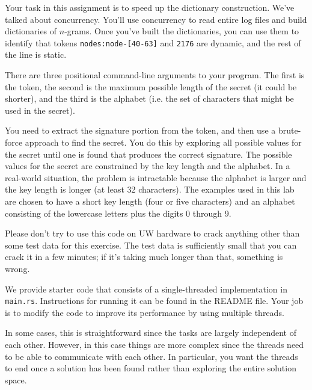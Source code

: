 \documentclass[12pt]{article}
\renewcommand{\_}{\kern-1.5pt\textunderscore\kern-1.5pt}
\begin{document}
Your task in this assignment is to speed up the dictionary construction. We've talked about concurrency. You'll use concurrency to read entire log files and build dictionaries of $n$-grams. Once you've built the dictionaries, you can use them to identify that tokens \texttt{nodes:node-[40-63]} and \texttt{2176} are dynamic, and the rest of the line is static.

\vspace*{1em} \noindent There are three positional command-line arguments to your program. The first is the token, the second is the maximum possible length of the secret (it could be shorter), and the third is the alphabet (i.e. the set of characters that might be used in the secret).\par

\vspace*{1em} \noindent You need to extract the signature portion from the token, and then use a brute-force approach to find the secret. You do this by exploring all possible values for the secret until one is found that produces the correct signature. The possible values for the secret are constrained by the key length and the alphabet. In a real-world situation, the problem is intractable because the alphabet is larger and the key length is longer (at least 32 characters). The examples used in this lab are chosen to have a short key length (four or five characters) and an alphabet consisting of the lowercase letters plus the digits 0 through 9.\par

\vspace*{1em} \noindent
  Please don’t try to use this code on UW hardware to crack anything other than some test data for this exercise. The test data is sufficiently small that you can crack it in a few minutes; if it’s taking much longer than that, something is wrong. \par

\vspace*{1em} \noindent
We provide starter code that consists of a single-threaded implementation in {\tt main.rs}. Instructions for running it can be found in the README file. Your job is to modify the code to improve its performance by using multiple threads.\par

\vspace*{1em} \noindent
In some cases, this is straightforward since the tasks are largely independent of each other. However, in this case things are more complex since the threads need to be able to communicate with each other. In particular, you want the threads to end once a solution has been found rather than exploring the entire solution space.\par
\end{document}
